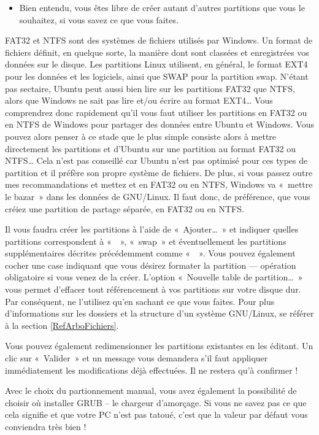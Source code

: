 \begin{itemize}
\begin{itemize}
\item Bien entendu, vous êtes libre de créer autant d'autres partitions que vous le souhaitez, si vous savez ce que vous faites.
\end{itemize}
\begin{nota}
FAT32 et NTFS sont des systèmes de fichiers utilisés par Windows. Un format de fichiers définit, en quelque sorte, la manière dont sont classées et enregistrées vos données sur le disque. Les partitions Linux utilisent, en général, le format EXT4 pour les données et les logiciels, ainsi que SWAP pour la partition swap. N'étant pas sectaire, Ubuntu peut aussi bien lire sur les partitions FAT32 que NTFS, alors que Windows ne sait pas lire et/ou écrire au format EXT4\ldots{} Vous comprendrez donc rapidement qu'il vous faut utiliser les partitions en FAT32 ou en NTFS de Windows pour partager des données entre Ubuntu et Windows. Vous pouvez alors penser à ce stade que le plus simple consiste alors à mettre directement les partitions  et \Chemin{/} d'Ubuntu sur une partition au format FAT32 ou NTFS\dots{} Cela n'est pas conseillé car Ubuntu n'est pas optimisé pour ces types de partition et il préfère son propre système de fichiers. De plus, si vous passez outre mes recommandations et mettez  et \Chemin{/} en FAT32 ou en NTFS, Windows va «~mettre le bazar~» dans les données de GNU/Linux. Il faut donc, de préférence, que vous créiez une partition de partage séparée, en FAT32 ou en NTFS.
\end{nota}
\end{itemize}\par
Il vous faudra créer les partitions à l'aide de «~Ajouter\ldots{}~» et indiquer quelles partitions correspondent à «~\Chemin{/}~», «~swap~» et éventuellement les partitions supplémentaires décrites précédemment comme «~~». Vous pouvez également cocher une case indiquant que vous désirez formater la partition --- opération obligatoire si vous venez de la créer. L'option «~Nouvelle table de partition\ldots{}~» vous permet d'effacer tout référencement à vos partitions sur votre disque dur. Par conséquent, ne l'utilisez qu'en sachant ce que vous faites. Pour plus d'informations sur les dossiers et la structure d'un système GNU/Linux, se référer à la section \ref{RefArboFichiers}.\par
Vous pouvez également redimensionner les partitions existantes en les éditant. Un clic sur «~Valider~» et un message vous demandera s'il faut appliquer immédiatement les modifications déjà effectuées. Il ne restera qu'à confirmer !
\begin{nota}
Avec le choix du partionnement manual, vous avez également la possibilité de choisir où installer GRUB -- le chargeur d'amorçage. Si vous ne savez pas ce que cela signifie et que votre PC n'est pas tatoué, c'est que la valeur par défaut vous conviendra très bien !
\end{nota}
